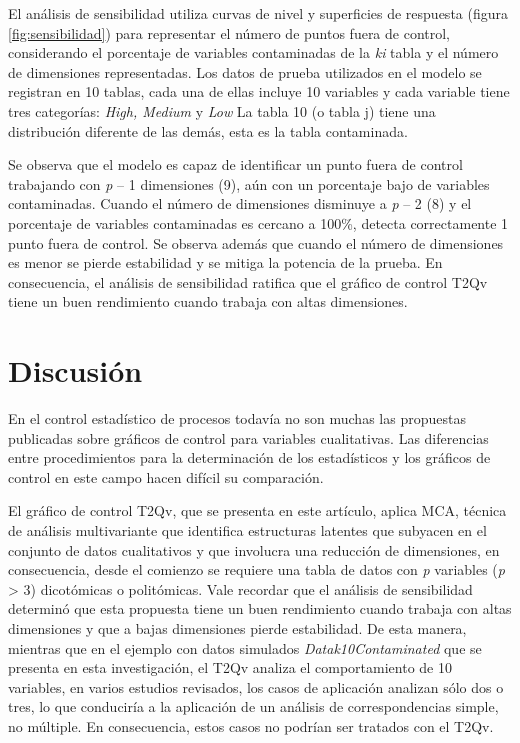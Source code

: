 \documentclass[mathematics,article,submit,moreauthors,pdftex]{mdpi}
\begin{document}
El análisis de sensibilidad utiliza curvas de nivel y superficies de
respuesta (figura \ref{fig:sensibilidad}) para representar el número de
puntos fuera de control, considerando el porcentaje de variables
contaminadas de la \emph{ki} tabla y el número de dimensiones
representadas. Los datos de prueba utilizados en el modelo se registran
en 10 tablas, cada una de ellas incluye 10 variables y cada variable
tiene tres categorías: \emph{High, Medium} y \emph{Low} La tabla 10 (o
tabla j) tiene una distribución diferente de las demás, esta es la tabla
contaminada.

Se observa que el modelo es capaz de identificar un punto fuera de
control trabajando con \emph{p} -- 1 dimensiones (9), aún con un
porcentaje bajo de variables contaminadas. Cuando el número de
dimensiones disminuye a \emph{p} -- 2 (8) y el porcentaje de variables
contaminadas es cercano a 100\%, detecta correctamente 1 punto fuera de
control. Se observa además que cuando el número de dimensiones es menor
se pierde estabilidad y se mitiga la potencia de la prueba. En
consecuencia, el análisis de sensibilidad ratifica que el gráfico de
control T2Qv tiene un buen rendimiento cuando trabaja con altas
dimensiones.

\hypertarget{discusiuxf3n}{%
\section{Discusión}\label{discusiuxf3n}}

En el control estadístico de procesos todavía no son muchas las
propuestas publicadas sobre gráficos de control para variables
cualitativas. Las diferencias entre procedimientos para la determinación
de los estadísticos y los gráficos de control en este campo hacen
difícil su comparación.

El gráfico de control T2Qv, que se presenta en este artículo, aplica
MCA, técnica de análisis multivariante que identifica estructuras
latentes que subyacen en el conjunto de datos cualitativos y que
involucra una reducción de dimensiones, en consecuencia, desde el
comienzo se requiere una tabla de datos con \emph{p} variables (\emph{p}
\textgreater{} 3) dicotómicas o politómicas. Vale recordar que el
análisis de sensibilidad determinó que esta propuesta tiene un buen
rendimiento cuando trabaja con altas dimensiones y que a bajas
dimensiones pierde estabilidad. De esta manera, mientras que en el
ejemplo con datos simulados \emph{Datak10Contaminated} que se presenta
en esta investigación, el T2Qv analiza el comportamiento de 10
variables, en varios estudios revisados, los casos de aplicación
analizan sólo dos o tres, lo que conduciría a la aplicación de un
análisis de correspondencias simple, no múltiple. En consecuencia, estos
casos no podrían ser tratados con el T2Qv.
\end{document}
